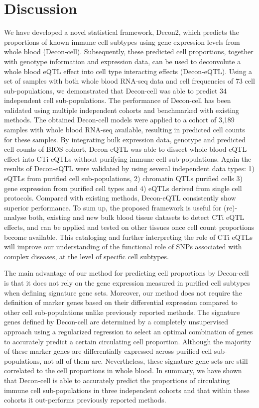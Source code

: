 \section{Discussion}
We have developed a novel statistical framework, Decon2, which predicts the proportions of known immune cell subtypes using gene expression levels from whole blood (Decon-cell). Subsequently, these predicted cell proportions, together with genotype information and expression data, can be used to deconvolute a whole blood  eQTL effect into cell type interacting effects (Decon-eQTL). Using a set of samples with both whole blood RNA-seq data and cell frequencies of 73 cell sub-populations, we demonstrated that Decon-cell was able to predict 34 independent cell sub-populations. The performance of Decon-cell has been validated using multiple independent cohorts and benchmarked with existing methods. The obtained Decon-cell models were applied to a cohort of 3,189 samples with whole blood RNA-seq available, resulting in predicted cell counts for these samples. By integrating bulk expression data, genotype and predicted cell counts of BIOS cohort,  Decon-eQTL was able to dissect whole blood eQTL effect into CTi eQTLs without purifying immune cell sub-populations. Again the results of Decon-eQTL were validated by using several independent data types: 1) eQTLs from purified cell sub-populations, 2) chromatin QTLs purified cells 3) gene expression from purified cell types and 4) eQTLs derived from single cell protocols. Compared with existing methods, Decon-eQTL consistently show superior performance. To sum up, the proposed framework is useful for (re)-analyse both, existing and new bulk blood tissue datasets to detect CTi eQTL effects, and can be applied and tested on other tissues once cell count proportions become available. This cataloging and further interpreting the role of CTi eQTLs will improve our understanding of the functional role of SNPs associated with complex diseases, at the level of specific cell subtypes.

The main advantage of our method for predicting cell proportions by Decon-cell  is that it does not rely on the gene expression measured in purified cell subtypes when defining signature gene sets. Moreover, our method does not require the definition of marker genes based on their differential expression compared to other cell sub-populations unlike previously reported methods\cite{aranXCellDigitallyPortraying2017}. The signature genes defined by Decon-cell are determined by a completely unsupervised approach using a regularized regression to select an optimal combination of genes to accurately predict a certain circulating cell proportion. Although the majority of these marker genes are differentially expressed across purified cell sub-populations, not all of them are. Nevertheless, these signature gene sets are still correlated to the cell proportions in whole blood. In summary, we have shown that Decon-cell is able to accurately predict the proportions of circulating immune cell sub-populations in three independent cohorts and that within these cohorts it out-performs previously reported methods.

